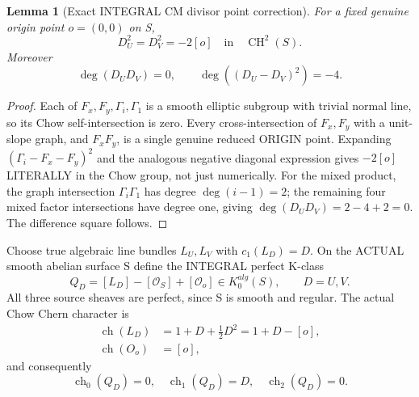 \documentclass[11pt,a4paper]{article}
\newcommand{\CH}{\operatorname{CH}}
\newcommand{\ch}{\operatorname{ch}}
\newtheorem{lemma}[theorem]{Lemma}
\begin{document}
\begin{lemma}[Exact INTEGRAL CM divisor point correction]
For a fixed
genuine origin
point \(o=(0,0)\)
on S,
\[
 \boxed{
 D_U^2=D_V^2=-2[o]
          \quad\text{in}\quad
          \CH^2(S).
 }                                                       \tag{11.2}
\]
Moreover
\[
 \deg(D_U D_V)=0,
 \qquad
 \deg((D_U-D_V)^2)=-4.
                                                               \tag{11.3}
\]
\end{lemma}
\begin{proof}
Each of
\(F_x,F_y,\Gamma_i,
\Gamma_1\)
is a smooth
elliptic subgroup
with trivial
normal line,
so its
Chow self-intersection
is zero.
Every
cross-intersection
of \(F_x,F_y\)
with a
unit-slope
graph, and
\(F_xF_y\),
is a single
genuine reduced
ORIGIN point.
Expanding
\((\Gamma_i-F_x-F_y)^2\)
and the analogous
negative diagonal
expression gives
\(-2[o]\)
LITERALLY in
the Chow group,
not just
numerically.
For the mixed
product, the
graph intersection
\(\Gamma_i\Gamma_1\)
has degree
\(\deg(i-1)=2\);
the remaining
four mixed
factor intersections
have degree one,
giving
\(\deg(D_UD_V)
=2-4+2=0\).
The difference
square follows.
\end{proof}

Choose true
algebraic
line bundles
\(L_U,L_V\)
with
\(c_1(L_D)=D\).
On the ACTUAL
smooth abelian
surface S define
the INTEGRAL
perfect K-class
\[
 \boxed{
 Q_D=[L_D]-[\mathcal O_S]
                   +[\mathcal O_o]
           \in K_0^{alg}(S),
 \qquad D=U,V.}
                                                               \tag{11.4}
\]
All three
source sheaves
are perfect,
since S is
smooth and
regular.
The actual
Chow Chern
character is
\[
 \begin{aligned}
 \ch(L_D)
    &=1+D+\tfrac12D^2
      =1+D-[o],\\
 \ch(O_o)&=[o],
 \end{aligned}
\]
and consequently
\[
 \boxed{
 \ch_0(Q_D)=0,\quad
 \ch_1(Q_D)=D,\quad
 \ch_2(Q_D)=0 .
 }                                                       \tag{11.5}
\]
\end{document}
